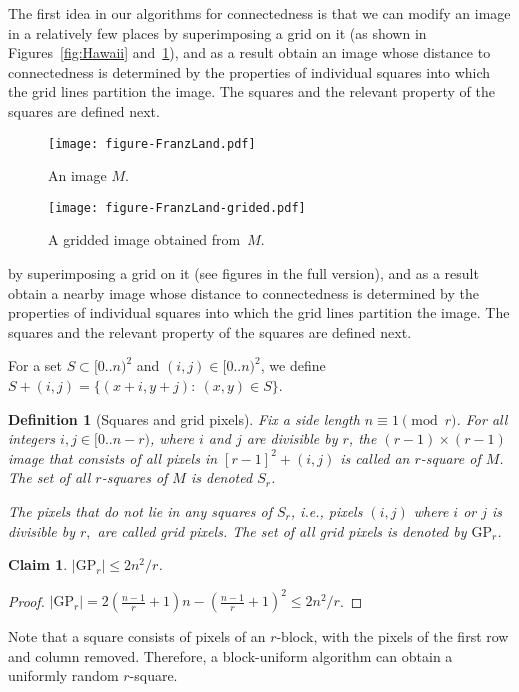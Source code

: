 \documentclass[11pt,english]{article}
\newtheorem{claim}[theorem]{Claim}
\newtheorem{definition}{Definition}[section]
\numberwithin{figure}{section}
\newcommand{\integerset}[1]{[0..{#1})}
\newcommand{\gp}{\text{GP}}
\newcommand{\side}{r}
\newcommand{\rblock}{$\side$-block\xspace}
\begin{document}
The first idea in our algorithms for connectedness is that we can modify an image
\ifnum{}
in a relatively few places by superimposing a grid on it
(as shown in Figures~\ref{fig:Hawaii} and~\ref{fig:Hawaii-grided}),
and as a result obtain an image whose distance to connectedness is determined by the properties of individual squares into which the grid lines partition the image. The squares and the relevant property of the squares  are defined next.
\begin{figure}[ht]
\begin{minipage}[b]{0.45\linewidth}
\centering
\texttt{[image: figure-FranzLand.pdf]}
\caption{An image $M$.}
\label{fig:Hawaii}
\end{minipage}
\hspace{0.1\linewidth}
\begin{minipage}[b]{0.45\linewidth}
\centering
\texttt{[image: figure-FranzLand-grided.pdf]}
\caption{A gridded image obtained from~$M$.}
\label{fig:Hawaii-grided}
\end{minipage}
\end{figure}
\else
by superimposing a grid on it
(see figures in the {\color{black} full version}),
and as a result obtain a nearby image whose distance to connectedness is determined by the properties of individual squares into which the grid lines partition the image. The squares and the relevant property of the squares  are defined next.
\fi

For a set $S\subset \integerset{n}^2$ and $(i,j)\in \integerset{n}^2$, we define
$S+(i,j)=\{(x+i,y+j):~(x,y)\in S\}$.

\begin{definition}[Squares and grid pixels]\label{def:squares} Fix a side length $n\equiv 1\pmod r$.
For all integers $i,j\in\integerset{n-r}$, where $i$ and $j$ are divisible by $r$, the $(r-1)\times (r-1)$ image that
consists of all pixels in $[r-1]^{2}+(i,j)$ is called an {\em $r$-square} of $M$. The set of all $r$-squares of $M$ is denoted $S_r$.

The pixels that do not lie in any squares of $S_r$, i.e., pixels $(i,j)$ where $i$ or $j$ is divisible by $r,$ are called {\em grid pixels}. The set of all grid pixels is denoted by $\gp_r$.
 \end{definition}

\begin{claim}\label{claim:GP-size}
$|\gp_r|\leq 2n^2/r$.
\end{claim}
\ifnum{}
\begin{proof}
$|\gp_r|=2(\frac{n-1}r +1)n-(\frac{n-1}r +1)^2
\leq 2n^2/r$.
\end{proof}
\fi
Note that a square consists of pixels of an \rblock, with the pixels of the first row and column removed. Therefore, a block-uniform algorithm can obtain a uniformly random $r$-square.
\end{document}
